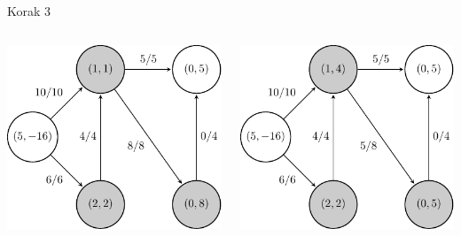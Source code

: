 \documentclass{beamer}
\begin{document}
\begin{frame}{Korak 3}
    \begin{columns}
        \begin{column}{0.5\textwidth}
            \centering
            \includegraphics[scale=0.7]{../writing/images/graf2-5.pdf}
        \end{column}

        \begin{column}{0.5\textwidth}
            \centering
            \includegraphics[scale=0.7]{../writing/images/graf2-4.pdf}
        \end{column}
    \end{columns}
\end{frame}
\end{document}
